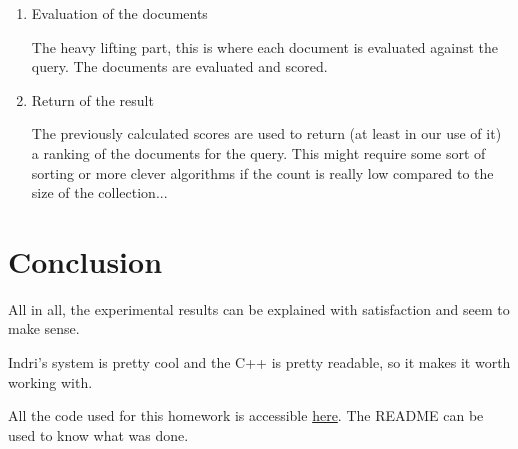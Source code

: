 \documentclass{article} %
\begin{document}
\begin{enumerate}
	\item Evaluation of the documents

The heavy lifting part, this is where each document is evaluated against the query. The documents are evaluated and scored.

	\item Return of the result

The previously calculated scores are used to return (at least in our use of it) a ranking of the documents for the query. This might require some sort of sorting or more clever algorithms if the count is really low compared to the size of the collection...

\end{enumerate}





\section{Conclusion}

All in all, the experimental results can be explained with satisfaction and seem to make sense.\newline

Indri's system is pretty cool and the C++ is pretty readable, so it makes it worth working with.\newline

All the code used for this homework is accessible \href{https://github.com/fracta/ift6255_recherche_info/tree/master/dev1}{here}. The README can be used to know what was done.
\end{document}
